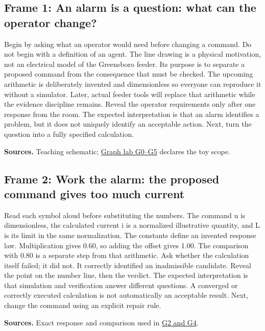\documentclass[11pt]{article}
\begin{document}
\subsection*{Frame 1: An alarm is a question: what can the operator change?}
Begin by asking what an operator would need before changing a command. Do not begin with a definition of an agent. The line drawing is a physical motivation, not an electrical model of the Greensboro feeder. Its purpose is to separate a proposed command from the consequence that must be checked. The upcoming arithmetic is deliberately invented and dimensionless so everyone can reproduce it without a simulator. Later, actual feeder tools will replace that arithmetic while the evidence discipline remains. Reveal the operator requirements only after one response from the room. The expected interpretation is that an alarm identifies a problem, but it does not uniquely identify an acceptable action. Next, turn the question into a fully specified calculation.\par
\par\nopagebreak\begin{minipage}{\linewidth}{\footnotesize\color{slate}\textbf{Sources.} Teaching schematic; \href{../Graph_Workflow_Lab.ipynb}{Graph lab G0--G5} declares the toy scope.\par}\end{minipage}\par\medskip
\subsection*{Frame 2: Work the alarm: the proposed command gives too much current}
Read each symbol aloud before substituting the numbers. The command u is dimensionless, the calculated current i is a normalized illustrative quantity, and L is its limit in the same normalization. The constants define an invented response law. Multiplication gives 0.60, so adding the offset gives 1.00. The comparison with 0.80 is a separate step from that arithmetic. Ask whether the calculation itself failed; it did not. It correctly identified an inadmissible candidate. Reveal the point on the number line, then the verdict. The expected interpretation is that simulation and verification answer different questions. A converged or correctly executed calculation is not automatically an acceptable result. Next, change the command using an explicit repair rule.\par
\par\nopagebreak\begin{minipage}{\linewidth}{\footnotesize\color{slate}\textbf{Sources.} Exact response and comparison used in \href{../Graph_Workflow_Lab.ipynb}{G2 and G4}.\par}\end{minipage}\par\medskip
\end{document}
